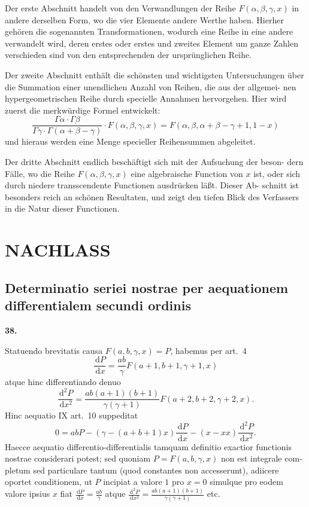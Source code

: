 \documentclass[12pt,a4paper]{article}
\newcommand{\dd}{\,\mathrm{d}}
\begin{document}
Der erste Abschnitt handelt von den Verwandlungen der Reihe $F(\alpha, \beta,
\gamma, x)$ in andere derselben Form, wo die vier Elemente andere Werthe haben.
Hierher gehören die sogenannten Transformationen, wodurch eine Reihe in eine
andere verwandelt wird, deren erstes oder erstes und zweites Element um ganze
Zahlen verschieden sind von den entsprechenden der ursprünglichen Reihe.

Der zweite Abschnitt enthält die schönsten und wichtigsten Untersuchungen
über die Summation einer unendlichen Anzahl von Reihen, die aus der allgemei-
nen hypergeometrischen Reihe durch specielle Annahmen hervorgehen. Hier wird
zuerst die merkwürdige Formel entwickelt:
\[
\frac{\Gamma \alpha \cdot \Gamma \beta}{\Gamma \gamma \cdot \Gamma(\alpha + \beta - \gamma)} \cdot F(\alpha, \beta, \gamma, x) = F(\alpha, \beta, \alpha + \beta - \gamma + 1, 1 - x)
\]
und hieraus werden eine Menge specieller Reihensummen abgeleitet.

Der dritte Abschnitt endlich beschäftigt sich mit der Aufsuchung der beson-
dern Fälle, wo die Reihe $F(\alpha, \beta, \gamma, x)$ eine algebraische Function von $x$ ist,
oder sich durch niedere transscendente Functionen ausdrücken läßt. Dieser Ab-
schnitt ist besonders reich an schönen Resultaten, und zeigt den tiefen Blick des
Verfassers in die Natur dieser Functionen.

\section*{NACHLASS}


\subsection*{Determinatio seriei nostrae per aequationem differentialem secundi ordinis}

\textbf{38.}

Statuendo brevitatis causa $F(a, b, \gamma, x) = P$, habemus per art.\ 4
\[
\frac{\dd P}{\dd x} = \frac{ab}{\gamma} F(a+1, b+1, \gamma+1, x)
\]
atque hinc differentiando denuo
\[
\frac{\dd^2 P}{\dd x^2} = \frac{ab(a+1)(b+1)}{\gamma(\gamma+1)} F(a+2, b+2, \gamma+2, x).
\]
Hinc aequatio IX art.\ 10 suppeditat
\[
0 = abP - (\gamma - (a+b+1)x) \frac{\dd P}{\dd x} - (x - xx) \frac{\dd^2 P}{\dd x^2}.
\]
Haecce aequatio differentio-differentialis tamquam definitio exactior functionis
nostrae considerari potest; sed quoniam $P = F(a,b,\gamma,x)$ non est integrale com-
pletum sed particulare tantum (quod constantes non accesserunt), adiicere oportet
conditionem, ut $P$ incipiat a valore $1$ pro $x = 0$ simulque pro eodem valore
ipsius $x$ fiat $\frac{\dd P}{\dd x} = \frac{ab}{\gamma}$ atque $\frac{\dd^2 P}{\dd x^2} = \frac{ab(a+1)(b+1)}{\gamma(\gamma+1)}$ etc.
\end{document}
